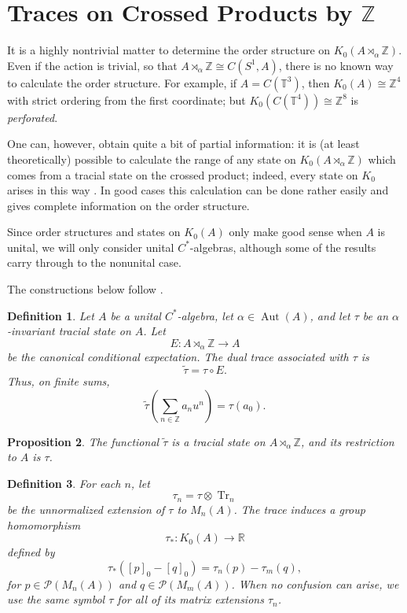 \documentclass{book}
\newtheorem{definition}{Definition}[section]
\newtheorem{proposition}[definition]{Proposition}
\def\cstar{\(C^*\)-algebra}
\def\cstars{\(C^*\)-algebras}
\begin{document}
\section{Traces on Crossed Products by \texorpdfstring{\(\mathbb{Z}\)}{Z}}
It is a highly nontrivial matter to determine the order structure on
\(K_0(A\rtimes_\alpha\mathbb{Z})\). Even if the action is trivial, so that
\(A\rtimes_\alpha\mathbb{Z}\cong C(S^1,A)\), there is no known way to calculate
the order structure. For example, if \(A=C(\mathbb{T}^3)\), then \(K_0(A)\cong\mathbb{Z}^4\)
with strict ordering from the first coordinate; but \(K_0(C(\mathbb{T}^4))\cong\mathbb{Z}^8\)
is \textit{perforated}.\par
One can, however, obtain quite a bit of partial information: it is (at least theoretically)
possible to calculate the range of any state on \(K_0(A\rtimes_\alpha\mathbb{Z})\)
which comes from a tracial state on the crossed product; indeed, every state on
\(K_0\) arises in this way \cite[Section~10.10]{Blackadar1998}. In good cases this calculation can be done
rather easily and gives complete information on the order structure.\par
Since order structures and states on \(K_0(A)\) only make good sense when \(A\)
is unital, we will only consider unital \cstars, although some of the results carry
through to the nonunital case.\par
The constructions below follow \cite[Sections~10.10.1--10.10.4]{Blackadar1998}.
\begin{definition}
  Let \(A\) be a unital \cstar, let
  \(\alpha\in\operatorname{Aut}(A)\), and let \(\tau\) be an
  \(\alpha\)-invariant tracial state on \(A\). Let
  \[
    E:A\rtimes_\alpha\mathbb{Z}\longrightarrow A
  \]
  be the canonical conditional expectation. The \textnormal{dual trace}
  associated with \(\tau\) is
  \[
    \widetilde{\tau}=\tau\circ E.
  \]
  Thus, on finite sums,
  \[
    \widetilde{\tau}\left(\sum_{n\in\mathbb{Z}}a_nu^n\right)
    =
    \tau(a_0).
  \] 
\end{definition}
\begin{proposition}\label{prop:dualTrace}
  The functional \(\widetilde{\tau}\) is a tracial state on
  \(A\rtimes_\alpha\mathbb{Z}\), and its restriction to \(A\) is
  \(\tau\).
\end{proposition}
\begin{definition}\label{def:traceOnK0}
  For each \(n\), let
  \[
    \tau_n=\tau\otimes\operatorname{Tr}_n
  \]
  be the unnormalized extension of \(\tau\) to \(M_n(A)\).
  The trace induces a group homomorphism
  \[
    \tau_*:K_0(A)\longrightarrow\mathbb{R}
  \]
  defined by
  \[
    \tau_*([p]_0-[q]_0)
    =
    \tau_n(p)-\tau_m(q),
  \]
  for \(p\in\mathcal P(M_n(A))\) and
  \(q\in\mathcal P(M_m(A))\).
  When no confusion can arise, we use the same symbol \(\tau\) for all
  of its matrix extensions \(\tau_n\).
\end{definition}
\end{document}
